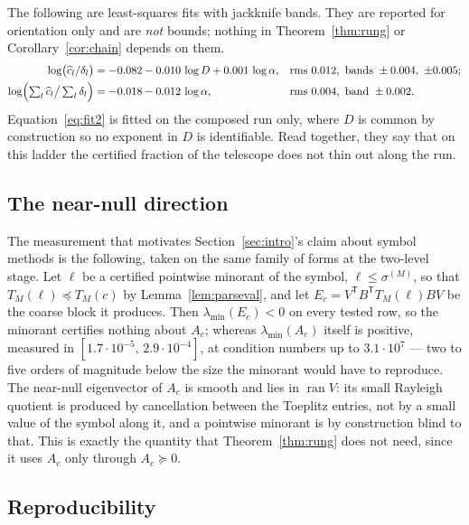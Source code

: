 \documentclass[11pt,a4paper]{article}
\theoremstyle{plain}
\theoremstyle{definition}
\newcommand{\T}{\mathsf{T}}
\newcommand{\Tm}[1]{T_{#1}}
\newcommand{\lmin}{\lambda_{\min}}
\newcommand{\ran}{\operatorname{ran}}
\newcommand{\PSD}{\succeq 0}
\begin{document}
The following are least-squares fits with jackknife bands. They are reported for
orientation only and are \emph{not} bounds; nothing in
Theorem~\ref{thm:rung} or Corollary~\ref{cor:chain} depends on them.
\begin{align}
\label{eq:fit1}
  \log\bigl(\widehat c_{l}/\delta_{l}\bigr)
  &= -0.082-0.010\,\log D+0.001\,\log\alpha,
  && \text{rms }0.012,\ \text{bands }\pm0.004,\ \pm0.005;\\
\label{eq:fit2}
  \log\Bigl(\textstyle\sum_{l}\widehat c_{l}\big/\sum_{l}\delta_{l}\Bigr)
  &= -0.018-0.012\,\log\alpha,
  && \text{rms }0.004,\ \text{band }\pm0.002 .
\end{align}
Equation~\eqref{eq:fit2} is fitted on the composed run only, where $D$ is common by
construction so no exponent in $D$ is identifiable. Read together, they say that on
this ladder the certified fraction of the telescope does not thin out along the run.

\subsection{The near-null direction}
\label{sec:nearnull}

The measurement that motivates Section~\ref{sec:intro}'s claim about symbol methods is
the following, taken on the same family of forms at the two-level stage. Let $\ell$ be
a certified pointwise minorant of the symbol, $\ell\le\sigma^{(M)}$, so that
$\Tm{M}(\ell)\preceq\Tm{M}(c)$ by Lemma~\ref{lem:parseval}, and let
$E_{c}=V^{\T}B^{\T}\Tm{M}(\ell)BV$ be the coarse block it produces. Then
$\lmin(E_{c})<0$ on every tested row, so the minorant certifies nothing about
$A_{c}$; whereas $\lmin(A_{c})$ itself is positive, measured in
$[1.7\cdot10^{-5},\,2.9\cdot10^{-4}]$, at condition numbers up to
$3.1\cdot10^{7}$ --- two to five orders of magnitude below the size the minorant
would have to reproduce. The near-null eigenvector of $A_{c}$ is smooth and lies in
$\ran V$: its small Rayleigh quotient is produced by cancellation between the
Toeplitz entries, not by a small value of the symbol along it, and a pointwise
minorant is by construction blind to that. This is exactly the quantity that
Theorem~\ref{thm:rung} does not need, since it uses $A_{c}$ only through
$A_{c}\PSD$.

\subsection{Reproducibility}
\label{sec:repro}
\end{document}
